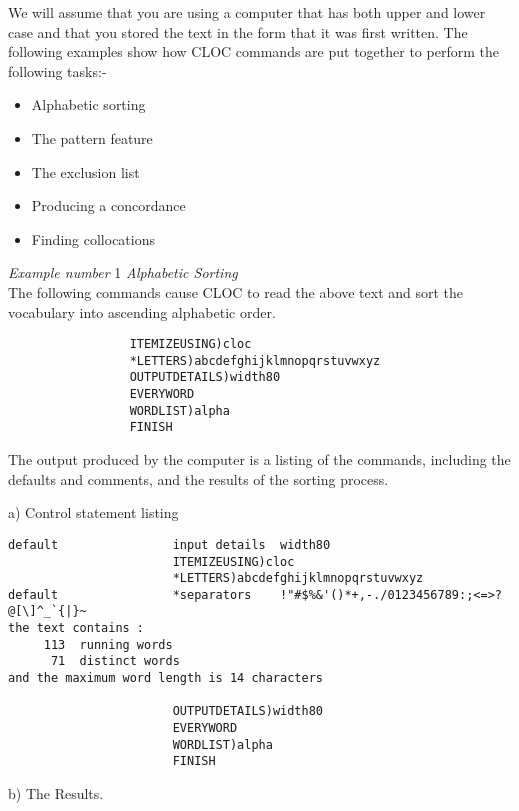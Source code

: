  We will assume that you are using a computer that has both upper
 and lower case and that you stored the text in the form that it
 was first written. The following examples show how CLOC commands
 are put together to perform the following tasks:-
\begin{itemize}
\item Alphabetic sorting
\item The pattern feature
\item The exclusion list
\item Producing a concordance
\item Finding collocations
\end{itemize}
\newpage
           {\em Example number} 1             {\em Alphabetic Sorting}\\
           The following commands cause CLOC to read the above text and
           sort the vocabulary into ascending alphabetic order.
\begin{verbatim}
                 ITEMIZEUSING)cloc
                 *LETTERS)abcdefghijklmnopqrstuvwxyz
                 OUTPUTDETAILS)width80
                 EVERYWORD
                 WORDLIST)alpha
                 FINISH
\end{verbatim}

           The output produced by the computer is a listing of the commands,
           including the defaults and comments, and the results of the
           sorting process.

                    a)  Control statement listing
\begin{verbatim}
default                input details  width80
                       ITEMIZEUSING)cloc
                       *LETTERS)abcdefghijklmnopqrstuvwxyz
default                *separators    !"#$%&'()*+,-./0123456789:;<=>?@[\]^_`{|}~
the text contains :
     113  running words
      71  distinct words
and the maximum word length is 14 characters

                       OUTPUTDETAILS)width80
                       EVERYWORD
                       WORDLIST)alpha
                       FINISH
\end{verbatim}
                     b)   The Results.


